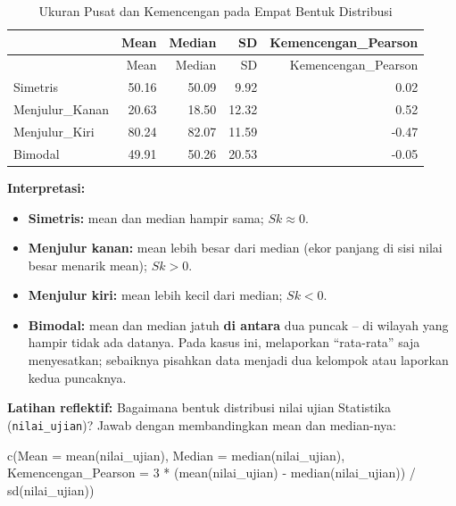 \documentclass[
  indonesian,
  letterpaper,
]{book}
\newenvironment{Shaded}{\begin{snugshade}}{\end{snugshade}}
\newcommand{\AttributeTok}[1]{\textcolor[rgb]{0.40,0.45,0.13}{#1}}
\newcommand{\DecValTok}[1]{\textcolor[rgb]{0.68,0.00,0.00}{#1}}
\newcommand{\FunctionTok}[1]{\textcolor[rgb]{0.28,0.35,0.67}{#1}}
\newcommand{\NormalTok}[1]{\textcolor[rgb]{0.00,0.23,0.31}{#1}}
\newcommand{\SpecialCharTok}[1]{\textcolor[rgb]{0.37,0.37,0.37}{#1}}
\providecommand{\tightlist}{%
  \setlength{\itemsep}{0pt}\setlength{\parskip}{0pt}}
\begin{document}
\begin{longtable}[]{@{}lrrrr@{}}
\caption{Ukuran Pusat dan Kemencengan pada Empat Bentuk
Distribusi}\tabularnewline
\toprule\noalign{}
& Mean & Median & SD & Kemencengan\_Pearson \\
\midrule\noalign{}
\endfirsthead
\toprule\noalign{}
& Mean & Median & SD & Kemencengan\_Pearson \\
\midrule\noalign{}
\endhead
\bottomrule\noalign{}
\endlastfoot
Simetris & 50.16 & 50.09 & 9.92 & 0.02 \\
Menjulur\_Kanan & 20.63 & 18.50 & 12.32 & 0.52 \\
Menjulur\_Kiri & 80.24 & 82.07 & 11.59 & -0.47 \\
Bimodal & 49.91 & 50.26 & 20.53 & -0.05 \\
\end{longtable}

\textbf{Interpretasi:}

\begin{itemize}
\tightlist
\item
  \textbf{Simetris:} mean dan median hampir sama; \(Sk \approx 0\).
\item
  \textbf{Menjulur kanan:} mean lebih besar dari median (ekor panjang di
  sisi nilai besar menarik mean); \(Sk > 0\).
\item
  \textbf{Menjulur kiri:} mean lebih kecil dari median; \(Sk < 0\).
\item
  \textbf{Bimodal:} mean dan median jatuh \textbf{di antara} dua puncak
  -- di wilayah yang hampir tidak ada datanya. Pada kasus ini,
  melaporkan ``rata-rata'' saja menyesatkan; sebaiknya pisahkan data
  menjadi dua kelompok atau laporkan kedua puncaknya.
\end{itemize}

\textbf{Latihan reflektif:} Bagaimana bentuk distribusi nilai ujian
Statistika (\texttt{nilai\_ujian})? Jawab dengan membandingkan mean dan
median-nya:

\begin{Shaded}
\begin{Highlighting}[]
\FunctionTok{c}\NormalTok{(}\AttributeTok{Mean =} \FunctionTok{mean}\NormalTok{(nilai\_ujian), }\AttributeTok{Median =} \FunctionTok{median}\NormalTok{(nilai\_ujian),}
\AttributeTok{Kemencengan\_Pearson =} \DecValTok{3} \SpecialCharTok{*}\NormalTok{ (}\FunctionTok{mean}\NormalTok{(nilai\_ujian) }\SpecialCharTok{{-}} \FunctionTok{median}\NormalTok{(nilai\_ujian)) }\SpecialCharTok{/} \FunctionTok{sd}\NormalTok{(nilai\_ujian))}
\end{Highlighting}
\end{Shaded}
\end{document}

